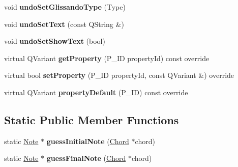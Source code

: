 \begin{DoxyCompactItemize}
void {\bfseries undo\+Set\+Glissando\+Type} (Type)
\item 
\mbox{\label{class_ms_1_1_glissando_ae4fc6301298bef1b3af3a014bec73386}} 
void {\bfseries undo\+Set\+Text} (const Q\+String \&)
\item 
\mbox{\label{class_ms_1_1_glissando_a1f8add7972b6bf84e6408322ab3d65e1}} 
void {\bfseries undo\+Set\+Show\+Text} (bool)
\item 
\mbox{\label{class_ms_1_1_glissando_aa225e4d608ea746f1f6e5873ac8dbe75}} 
virtual Q\+Variant {\bfseries get\+Property} (P\+\_\+\+ID property\+Id) const override
\item 
\mbox{\label{class_ms_1_1_glissando_a9144f326e20404bed53dbc6f1ea7b0bb}} 
virtual bool {\bfseries set\+Property} (P\+\_\+\+ID property\+Id, const Q\+Variant \&) override
\item 
\mbox{\label{class_ms_1_1_glissando_acede43ee70edbf5bf5d233b071605ad2}} 
virtual Q\+Variant {\bfseries property\+Default} (P\+\_\+\+ID) const override
\end{DoxyCompactItemize}
\subsection*{Static Public Member Functions}
\begin{DoxyCompactItemize}
\item 
\mbox{\label{class_ms_1_1_glissando_a19066d9818980d4177b724e54df62047}} 
static \hyperlink{class_ms_1_1_note}{Note} $\ast$ {\bfseries guess\+Initial\+Note} (\hyperlink{class_ms_1_1_chord}{Chord} $\ast$chord)
\item 
\mbox{\label{class_ms_1_1_glissando_ad8831adb09e3281539d91b7f68632996}} 
static \hyperlink{class_ms_1_1_note}{Note} $\ast$ {\bfseries guess\+Final\+Note} (\hyperlink{class_ms_1_1_chord}{Chord} $\ast$chord)
\end{DoxyCompactItemize}
